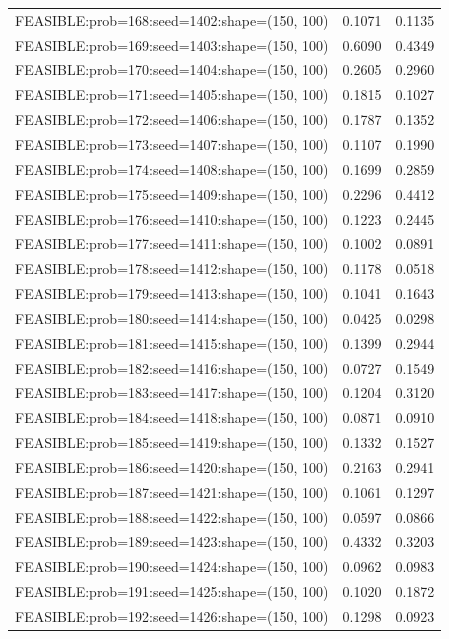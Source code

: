 \begin{longtable}{lcc}
FEASIBLE:prob=168:seed=1402:shape=(150, 100) &   0.1071 & 0.1135 \\
FEASIBLE:prob=169:seed=1403:shape=(150, 100) &   0.6090 & 0.4349 \\
FEASIBLE:prob=170:seed=1404:shape=(150, 100) &   0.2605 & 0.2960 \\
FEASIBLE:prob=171:seed=1405:shape=(150, 100) &   0.1815 & 0.1027 \\
FEASIBLE:prob=172:seed=1406:shape=(150, 100) &   0.1787 & 0.1352 \\
FEASIBLE:prob=173:seed=1407:shape=(150, 100) &   0.1107 & 0.1990 \\
FEASIBLE:prob=174:seed=1408:shape=(150, 100) &   0.1699 & 0.2859 \\
FEASIBLE:prob=175:seed=1409:shape=(150, 100) &   0.2296 & 0.4412 \\
FEASIBLE:prob=176:seed=1410:shape=(150, 100) &   0.1223 & 0.2445 \\
FEASIBLE:prob=177:seed=1411:shape=(150, 100) &   0.1002 & 0.0891 \\
FEASIBLE:prob=178:seed=1412:shape=(150, 100) &   0.1178 & 0.0518 \\
FEASIBLE:prob=179:seed=1413:shape=(150, 100) &   0.1041 & 0.1643 \\
FEASIBLE:prob=180:seed=1414:shape=(150, 100) &   0.0425 & 0.0298 \\
FEASIBLE:prob=181:seed=1415:shape=(150, 100) &   0.1399 & 0.2944 \\
FEASIBLE:prob=182:seed=1416:shape=(150, 100) &   0.0727 & 0.1549 \\
FEASIBLE:prob=183:seed=1417:shape=(150, 100) &   0.1204 & 0.3120 \\
FEASIBLE:prob=184:seed=1418:shape=(150, 100) &   0.0871 & 0.0910 \\
FEASIBLE:prob=185:seed=1419:shape=(150, 100) &   0.1332 & 0.1527 \\
FEASIBLE:prob=186:seed=1420:shape=(150, 100) &   0.2163 & 0.2941 \\
FEASIBLE:prob=187:seed=1421:shape=(150, 100) &   0.1061 & 0.1297 \\
FEASIBLE:prob=188:seed=1422:shape=(150, 100) &   0.0597 & 0.0866 \\
FEASIBLE:prob=189:seed=1423:shape=(150, 100) &   0.4332 & 0.3203 \\
FEASIBLE:prob=190:seed=1424:shape=(150, 100) &   0.0962 & 0.0983 \\
FEASIBLE:prob=191:seed=1425:shape=(150, 100) &   0.1020 & 0.1872 \\
FEASIBLE:prob=192:seed=1426:shape=(150, 100) &   0.1298 & 0.0923 \\

\end{longtable}
